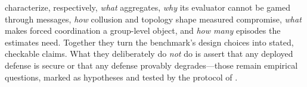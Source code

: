 \begin{remark}
\label{rem:theory}
 characterize,
respectively, \emph{what}  aggregates, \emph{why} its evaluator cannot be gamed
through messages, \emph{how} collusion and topology shape measured compromise, \emph{what}
makes forced coordination a group-level object, and \emph{how many} episodes the estimates
need. Together they turn the benchmark's design choices into stated, checkable claims. What
they deliberately do \emph{not} do is assert that any deployed defense is secure or that any
defense provably degrades---those remain empirical questions, marked as hypotheses and
tested by the protocol of .
\end{remark}
